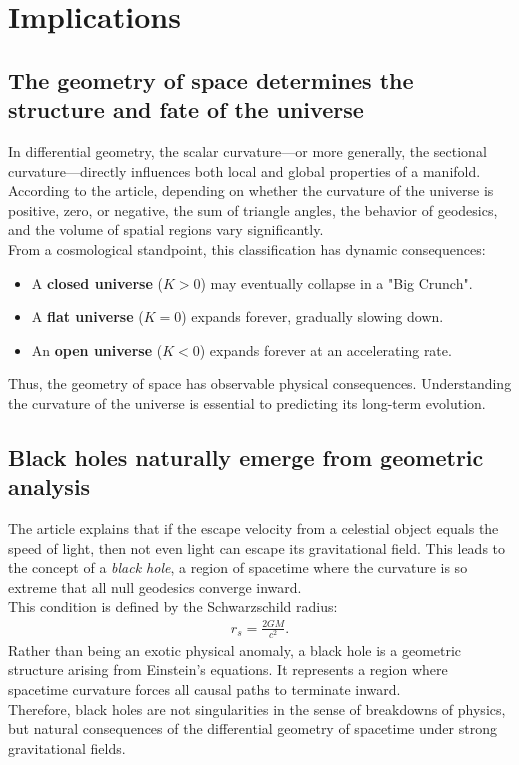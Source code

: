\documentclass{aleph-revista}
\begin{document}
\section{Implications}
\subsection*{The geometry of space determines the structure and fate of the universe}
In differential geometry, the scalar curvature—or more generally, the sectional curvature—directly influences both local and global properties of a manifold. According to the article, depending on whether the curvature of the universe is positive, zero, or negative, the sum of triangle angles, the behavior of geodesics, and the volume of spatial regions vary significantly.\\
From a cosmological standpoint, this classification has dynamic consequences:
\begin{itemize}
  \item A \textbf{closed universe} ($K > 0$) may eventually collapse in a "Big Crunch".
  \item A \textbf{flat universe} ($K = 0$) expands forever, gradually slowing down.
  \item An \textbf{open universe} ($K < 0$) expands forever at an accelerating rate.
\end{itemize}
Thus, the geometry of space has observable physical consequences. Understanding the curvature of the universe is essential to predicting its long-term evolution.
\subsection*{Black holes naturally emerge from geometric analysis}
The article explains that if the escape velocity from a celestial object equals the speed of light, then not even light can escape its gravitational field. This leads to the concept of a \textit{black hole}, a region of spacetime where the curvature is so extreme that all null geodesics converge inward.\\
This condition is defined by the Schwarzschild radius:
\begin{align*}
r_s = \frac{2GM}{c^2}.
\end{align*}
Rather than being an exotic physical anomaly, a black hole is a geometric structure arising from Einstein's equations. It represents a region where spacetime curvature forces all causal paths to terminate inward.\\
Therefore, black holes are not singularities in the sense of breakdowns of physics, but natural consequences of the differential geometry of spacetime under strong gravitational fields.
\end{document}
